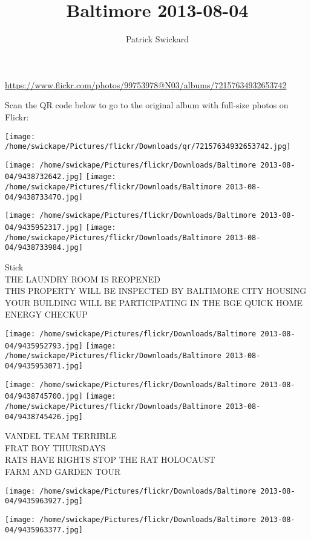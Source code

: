 \documentclass[10pt,letterpaper]{article}
\title{Baltimore 2013-08-04}
\author{Patrick Swickard}
\date{}
\begin{document}
\maketitle

\url{https://www.flickr.com/photos/99753978@N03/albums/72157634932653742}

Scan the QR code below to go to the original album with full-size photos on Flickr:

\texttt{[image: /home/swickape/Pictures/flickr/Downloads/qr/72157634932653742.jpg]}
\pagebreak

\texttt{[image: /home/swickape/Pictures/flickr/Downloads/Baltimore 2013-08-04/9438732642.jpg]}
\texttt{[image: /home/swickape/Pictures/flickr/Downloads/Baltimore 2013-08-04/9438733470.jpg]}

\texttt{[image: /home/swickape/Pictures/flickr/Downloads/Baltimore 2013-08-04/9435952317.jpg]}
\texttt{[image: /home/swickape/Pictures/flickr/Downloads/Baltimore 2013-08-04/9438733984.jpg]}

Stick\\
THE LAUNDRY ROOM IS REOPENED\\
THIS PROPERTY WILL BE INSPECTED BY BALTIMORE CITY HOUSING\\
YOUR BUILDING WILL BE PARTICIPATING IN THE BGE QUICK HOME ENERGY CHECKUP
\pagebreak

\texttt{[image: /home/swickape/Pictures/flickr/Downloads/Baltimore 2013-08-04/9435952793.jpg]}
\texttt{[image: /home/swickape/Pictures/flickr/Downloads/Baltimore 2013-08-04/9435953071.jpg]}

\texttt{[image: /home/swickape/Pictures/flickr/Downloads/Baltimore 2013-08-04/9438745700.jpg]}
\texttt{[image: /home/swickape/Pictures/flickr/Downloads/Baltimore 2013-08-04/9438745426.jpg]}

VANDEL TEAM TERRIBLE\\
FRAT BOY THURSDAYS\\
RATS HAVE RIGHTS STOP THE RAT HOLOCAUST\\
FARM AND GARDEN TOUR
\pagebreak

\texttt{[image: /home/swickape/Pictures/flickr/Downloads/Baltimore 2013-08-04/9435963927.jpg]}

\vspace{0.25in}
\texttt{[image: /home/swickape/Pictures/flickr/Downloads/Baltimore 2013-08-04/9435963377.jpg]}
\end{document}
